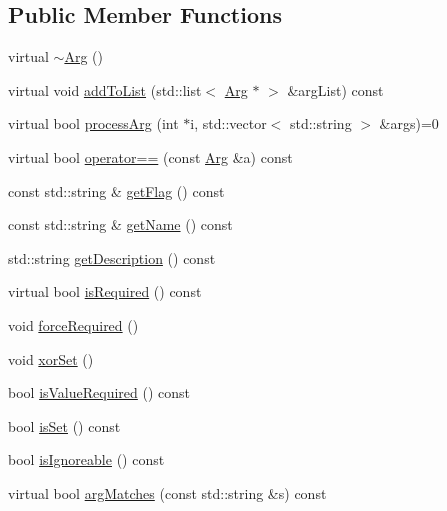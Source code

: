 \subsection*{Public Member Functions}
\begin{DoxyCompactItemize}
\item 
virtual \hyperlink{class_t_c_l_a_p_1_1_arg_a15734a7cf52c8c4ab6df70f0997bbee3}{$\sim$\+Arg} ()
\item 
virtual void \hyperlink{class_t_c_l_a_p_1_1_arg_a9ff1564beeea2ef855f7fa483c37d0e2}{add\+To\+List} (std\+::list$<$ \hyperlink{class_t_c_l_a_p_1_1_arg}{Arg} $\ast$ $>$ \&arg\+List) const 
\item 
virtual bool \hyperlink{class_t_c_l_a_p_1_1_arg_a61ffe2f660a76111d256f7b22a686146}{process\+Arg} (int $\ast$i, std\+::vector$<$ std\+::string $>$ \&args)=0
\item 
virtual bool \hyperlink{class_t_c_l_a_p_1_1_arg_a657a8d2842b7de9ced5a5a55db01d367}{operator==} (const \hyperlink{class_t_c_l_a_p_1_1_arg}{Arg} \&a) const 
\item 
const std\+::string \& \hyperlink{class_t_c_l_a_p_1_1_arg_a22f616e81a423e794f13a9ae1549ac77}{get\+Flag} () const 
\item 
const std\+::string \& \hyperlink{class_t_c_l_a_p_1_1_arg_a641ced141a56c74fee11d3e3a808f731}{get\+Name} () const 
\item 
std\+::string \hyperlink{class_t_c_l_a_p_1_1_arg_a1943999fadcb4f28cecd6ba55ed0b085}{get\+Description} () const 
\item 
virtual bool \hyperlink{class_t_c_l_a_p_1_1_arg_a00a3cfdb2b6e9a111ad39cbd4978b96c}{is\+Required} () const 
\item 
void \hyperlink{class_t_c_l_a_p_1_1_arg_a58e3de560f364d0bb6bdf36ab533a6fd}{force\+Required} ()
\item 
void \hyperlink{class_t_c_l_a_p_1_1_arg_aec525c8092e56f7f5aa455e71bc72374}{xor\+Set} ()
\item 
bool \hyperlink{class_t_c_l_a_p_1_1_arg_a1373d50d4b93c16db43c7600cf6d0355}{is\+Value\+Required} () const 
\item 
bool \hyperlink{class_t_c_l_a_p_1_1_arg_a6af7a1e92b5d92fc2d90c1a95aab4384}{is\+Set} () const 
\item 
bool \hyperlink{class_t_c_l_a_p_1_1_arg_a33816b5ccc58a15f3a998480e5d988e2}{is\+Ignoreable} () const 
\item 
virtual bool \hyperlink{class_t_c_l_a_p_1_1_arg_aac37b1b734b477e5d16f2037dba9c125}{arg\+Matches} (const std\+::string \&s) const 
\item 

\end{DoxyCompactItemize}

